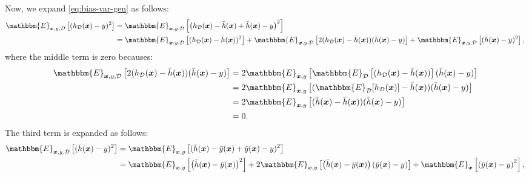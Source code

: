         Now, we expand \eqref{eq:bias-var-gen} as follows:
            \begin{equation}
                \begin{aligned}
                    \mathbbm{E}_{\bm{x}, y, \mathcal{D}}\left[ (h_{\mathcal{D}}(\bm{x}) - y )^2 \right] & = \mathbbm{E}_{\bm{x}, y, \mathcal{D}}\left[ \left( h_{\mathcal{D}}(\bm{x}) - \bar{h}(\bm{x}) + \bar{h}(\bm{x}) - y \right)^2 \right] \\
                    & = \mathbbm{E}_{\bm{x}, y, \mathcal{D}}\left[ (h_{\mathcal{D}}(\bm{x}) - \bar{h}(\bm{x}))^2 \right] + \mathbbm{E}_{\bm{x}, y, \mathcal{D}}\left[ 2(h_{\mathcal{D}}(\bm{x}) - \bar{h}(\bm{x}))(\bar{h}(\bm{x}) - y) \right] + \mathbbm{E}_{\bm{x}, y, \mathcal{D}}\left[ (\bar{h}(\bm{x}) - y)^2 \right],
                \end{aligned}
            \end{equation}
        where the middle term is zero becauses:
            \begin{equation}
                \begin{aligned}
                      \mathbbm{E}_{\bm{x}, y, \mathcal{D}}\left[ 2(h_{\mathcal{D}}(\bm{x}) - \bar{h}(\bm{x}))(\bar{h}(\bm{x}) - y) \right] & = 2\mathbbm{E}_{\bm{x}, y}\left[ \mathbbm{E}_{\mathcal{D}}\left[ (h_{\mathcal{D}}(\bm{x}) - \bar{h}(\bm{x}) ) \right](\bar{h}(\bm{x}) - y) \right]      \\
                      & = 2\mathbbm{E}_{\bm{x}, y}\left[  ( \mathbbm{E}_{\mathcal{D}}[h_{\mathcal{D}}(\bm{x})] - \bar{h}(\bm{x}) ) (\bar{h}(\bm{x}) - y) \right] \\
                      & = 2\mathbbm{E}_{\bm{x}, y}\left[  ( \bar{h}(\bm{x}) - \bar{h}(\bm{x}) ) (\bar{h}(\bm{x}) - y) \right] \\
                      & = 0.
                \end{aligned}
            \end{equation}
        The third term is expanded as follows:
            \begin{equation}
                \begin{aligned}
                \mathbbm{E}_{\bm{x}, y, \mathcal{D}}\left[ (\bar{h}(\bm{x}) - y)^2 \right] & = \mathbbm{E}_{\bm{x}, y }\left[ (\bar{h}(\bm{x}) - \bar{y}(\bm{x}) + \bar{y}(\bm{x}) - y)^2 \right] \\
                & = \mathbbm{E}_{\bm{x}, y }\left[ \left( \bar{h}(\bm{x}) - \bar{y}(\bm{x}) \right)^2 \right] + 2\mathbbm{E}_{\bm{x}, y }\left[ \left( \bar{h}(\bm{x}) - \bar{y}(\bm{x}) \right)\left( \bar{y}(\bm{x}) - y \right) \right] + \mathbbm{E}_{\bm{x}}\left[ \left( \bar{y}(\bm{x}) - y \right)^2 \right],
                \end{aligned}
            \end{equation}
